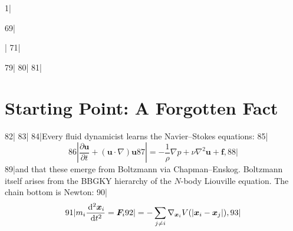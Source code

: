 1|\documentclass[11pt,a4paper]{article}
\begin{document}
69||
71|\begin{abstract}
72|We propose a fundamental epistemological reconstruction: turbulence is not a closure problem, but an \textbf{unidentifiability problem}unidentifiability problem
73|—— $\bm{F}=m\bm{a}$ $N$ MD $N\to\infty$  Boltzmann  Navier--StokesNS $10^{23}$ 
74|
75|This paper presents three theorems. \textbf{~1} RANS ——$\TV(P_h^{\mathcal{W}_A}, P_h^{\mathcal{W}_B}) \leq C\cdot h^{\alpha}$ $h\to 0$  $\TV\to 0$ $h>0$  $\TV>0$\textbf{~2}$M$ RANS $k$-$\varepsilon$, $k$-$\omega$ SST, LES, DES, DNS $\Delta$ systematic bias $\mathbb{P}(\cap_{m=1}^{M}\{B_m > \Delta\}) \leq \exp(-2M\Delta^2/L^2)$ DNS \textbf{~3}Kolmogorov  $h$  $E_h(k) = E_{\text{true}}(k) + C_{\text{res}}\cdot h^{2/3}\cdot k^{-5/3} + C_{\text{stat}}\cdot N^{-1/2} + o(h^{2/3} + N^{-1/2})$$-5/3$ ——Kolmogorov 
76|
77|The corollary: turbulence modeling is not about better closure models — it is about declaring your \textbf{resolution assumption}. At different resolutions, turbulence is different things.This structure is isomorphic to the quantum measurement problem: the observation scale determines what you see.
78|\end{abstract}
79|
80|%
81|\section{Starting Point: A Forgotten Fact}
82|%
83|
84|Every fluid dynamicist learns the Navier--Stokes equations:
85|\begin{equation}\label{eq:ns}
86|  \frac{\partial \bm{u}}{\partial t} + (\bm{u}\cdot\nabla)\bm{u}
87|  = -\frac{1}{\rho}\nabla p + \nu \nabla^2 \bm{u} + \bm{f},
88|\end{equation}
89|and that these emerge from Boltzmann via Chapman--Enskog. Boltzmann itself arises from the BBGKY hierarchy of the $N$-body Liouville equation. The chain bottom is Newton:
90|\begin{equation}\label{eq:newton}
91|  m_i \frac{\,\mathrm{d}^2 \bm{x}_i}{\,\mathrm{d} t^2} = \bm{F}_i
92|  = -\sum_{j\neq i} \nabla_{\bm{x}_i} V(\left\lvert\bm{x}_i - \bm{x}_j\right\rvert),
93|\end{equation}
\end{document}
